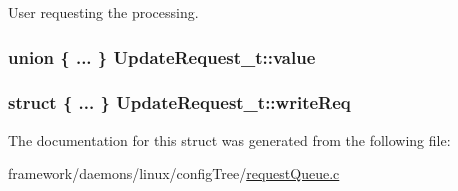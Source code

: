 User requesting the processing. 

\subsubsection[{\texorpdfstring{value}{value}}]{\setlength{\rightskip}{0pt plus 5cm}union \{ ... \} 
             Update\+Request\+\_\+t\+::value}\hypertarget{struct_update_request__t_ab004c43fda7d5ae05b381453596452df}{}\label{struct_update_request__t_ab004c43fda7d5ae05b381453596452df}
\subsubsection[{\texorpdfstring{write\+Req}{writeReq}}]{\setlength{\rightskip}{0pt plus 5cm}struct \{ ... \} 
         Update\+Request\+\_\+t\+::write\+Req}\hypertarget{struct_update_request__t_ab1fda0ec3b5afde781bff9e76ca84514}{}\label{struct_update_request__t_ab1fda0ec3b5afde781bff9e76ca84514}


The documentation for this struct was generated from the following file\+:\begin{DoxyCompactItemize}
\item 
framework/daemons/linux/config\+Tree/\hyperlink{request_queue_8c}{request\+Queue.\+c}\end{DoxyCompactItemize}
